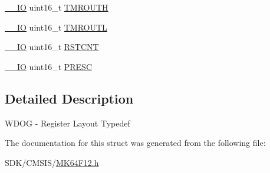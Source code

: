 \begin{DoxyCompactItemize}
\item 
\mbox{\hyperlink{core__cm4_8h_aec43007d9998a0a0e01faede4133d6be}{\+\_\+\+\_\+\+IO}} uint16\+\_\+t \mbox{\hyperlink{group___v_r_e_f___peripheral___access___layer_ga020e8a3bc802277ebdea61f18a256c65}{T\+M\+R\+O\+U\+TH}}
\item 
\mbox{\hyperlink{core__cm4_8h_aec43007d9998a0a0e01faede4133d6be}{\+\_\+\+\_\+\+IO}} uint16\+\_\+t \mbox{\hyperlink{group___v_r_e_f___peripheral___access___layer_gad5ebd770efd696047aa4ac98538a798d}{T\+M\+R\+O\+U\+TL}}
\item 
\mbox{\hyperlink{core__cm4_8h_aec43007d9998a0a0e01faede4133d6be}{\+\_\+\+\_\+\+IO}} uint16\+\_\+t \mbox{\hyperlink{group___v_r_e_f___peripheral___access___layer_ga095ee56174bca40b8f3b42792b2aa554}{R\+S\+T\+C\+NT}}
\item 
\mbox{\hyperlink{core__cm4_8h_aec43007d9998a0a0e01faede4133d6be}{\+\_\+\+\_\+\+IO}} uint16\+\_\+t \mbox{\hyperlink{group___v_r_e_f___peripheral___access___layer_gac91805542c28a212cea60963b3983981}{P\+R\+E\+SC}}
\end{DoxyCompactItemize}


\subsection{Detailed Description}
W\+D\+OG -\/ Register Layout Typedef 

The documentation for this struct was generated from the following file\+:\begin{DoxyCompactItemize}
\item 
S\+D\+K/\+C\+M\+S\+I\+S/\mbox{\hyperlink{_m_k64_f12_8h}{M\+K64\+F12.\+h}}\end{DoxyCompactItemize}
